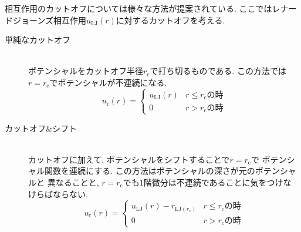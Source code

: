 相互作用のカットオフについては様々な方法が提案されている.
ここではレナードジョーンズ相互作用$u_{\mathrm{LJ}} (r)$に対するカットオフを考える.
\begin{description}
 \item[単純なカットオフ] \mbox{}\\
 ポテンシャルをカットオフ半径$r_{\mathrm{c}}$で打ち切るものである.
 この方法では$r=r_{\mathrm{c}}$でポテンシャルが不連続になる.
 \begin{equation}
  u_{\mathrm{r}} (r) =
  \begin{cases}
   u_{\mathrm{LJ}}(r) & \text{$r \le r_{\mathrm{c}}$の時} \\
   0                  & \text{$r  > r_{\mathrm{c}}$の時}
  \end{cases}
\end{equation}

 \item[カットオフ\&シフト] \mbox{}\\
 カットオフに加えて, ポテンシャルをシフトすることで$r=r_{\mathrm{c}}$で
 ポテンシャル関数を連続にする. この方法はポテンシャルの深さが元のポテンシャルと
 異なることと, $r=r_{\mathrm{c}}$でも1階微分は不連続であることに気をつけな
 けらばならない.
 \begin{equation}
  u_{\mathrm{r}} (r) =
  \begin{cases}
   u_{\mathrm{LJ}}(r) - r_{\mathrm{LJ} (r_{\mathrm{c}})} & \text{$r \le r_{\mathrm{c}}$の時} \\
   0                  & \text{$r  > r_{\mathrm{c}}$の時}
  \end{cases}
\end{equation}


\end{description}
